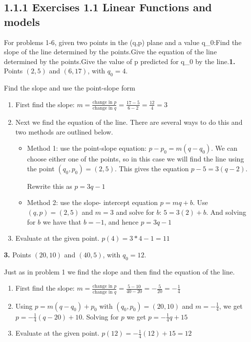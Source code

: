\documentclass[10pt,]{book}
\theoremstyle{plain}
\theoremstyle{definition}
\theoremstyle{definition}
\begin{document}
\subsection*{1.1.1 Exercises 1.1 Linear Functions and models}
For problems 1-6, given two points in the (q,p) plane and a value q_0:Find the slope of the line determined by the points.Give the equation of the line determined by the points.Give the value of p predicted for q_0 by the line.\noindent\textbf{1.}\quad{} 
Points \((2,5)\) and \((6,17)\), with \(q_0=4\).
%
\par\smallskip
Find the slope and use the point-slope form%
\par\smallskip
\leavevmode%
\begin{enumerate}[label=(\alph*)]
\item\hypertarget{li-26}{}First find the slope: \(m=  \frac{\text{change in }p}{\text{change in }q}
=  \frac{17-5}{6-2}=\frac{12}{4}=3\)%
\item\hypertarget{li-27}{}Next we find the equation of the line. There are several ways to do this and two methods are outlined below.%
%
\begin{itemize}[label=\textbullet]
\item{}Method 1: use the point-slope equation: \(p-p_0=m (q-q_0)\).
We can choose either one of the points, so in this case we will find the line using the point \((q_0,p_0 )=(2,5)\). This gives the equation
\(p-5=3 (q-2)\).%
\par
Rewrite this as \(p=3q-1\)%
\item{}Method 2: use the slope- intercept equation \(p=m q+b\).
Use \((q,p)=(2,5)\) and \(m = 3\) and solve for \(b\):
\(5=3 (2)+b\).
And solving for \(b\) we have that \(b= -1\), and hence \(p=3q-1\)%
\end{itemize}
\item\hypertarget{li-30}{}Evaluate at the given point.  \(p(4)=3*4-1=11\)%
\end{enumerate}
\par\smallskip
\noindent\textbf{3.}\quad{} Points \((20,10)\) and \((40,5)\), with \(q_0=12\).
%
\par\smallskip
Just as in problem 1 we find the slope and then find the equation of the line.%
\leavevmode%
\begin{enumerate}[label=(\alph*)]
\item\hypertarget{li-31}{}First find the slope: \(m=  \frac{\text{change in }p}{\text{change in }q}
=  \frac{5-10}{40-20}=-\frac{5}{20}=-\frac{1}{4}\)%
\item\hypertarget{li-32}{}Using \(p=m (q-q_0)+p_0\) with \((q_0,p_0 )=(20, 10)\) and \(m = -\frac{1}{4}\), we get \(p=-\frac{1}{4}(q-20)+10\).  Solving for \(p\) we get \(p =-\frac{1}{4}q+15\)%
\item\hypertarget{li-33}{}Evaluate at the given point.  \(p(12)=-\frac{1}{4}(12)+15=12\)%
\end{enumerate}
\end{document}
